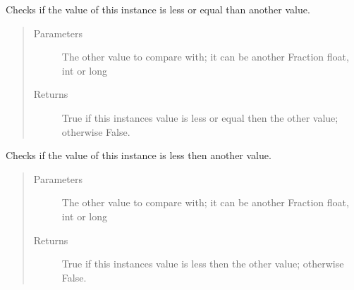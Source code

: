 \documentclass[letterpaper,10pt,english]{sphinxhowto}
\begin{document}
\begin{fulllineitems}
\begin{fulllineitems}
\begin{quote}
\begin{description}
\end{description}\end{quote}

\end{fulllineitems}


\begin{fulllineitems}
\label{\detokenize{fraction:fraction.Fraction.__le__}}
Checks if the value of this instance is less or equal than another value.
\begin{quote}\begin{description}
\item[{Parameters}] \leavevmode
{} \textendash{} The other value to compare with; it can be another Fraction float, int or long

\item[{Returns}] \leavevmode
True if this instances value is less or equal then the other value; otherwise False.

\end{description}\end{quote}

\end{fulllineitems}


\begin{fulllineitems}
\label{\detokenize{fraction:fraction.Fraction.__lt__}}
Checks if the value of this instance is less then another value.
\begin{quote}\begin{description}
\item[{Parameters}] \leavevmode
{} \textendash{} The other value to compare with; it can be another Fraction float, int or long

\item[{Returns}] \leavevmode
True if this instances value is less then the other value; otherwise False.

\end{description}\end{quote}

\end{fulllineitems}



\end{fulllineitems}
\end{document}
